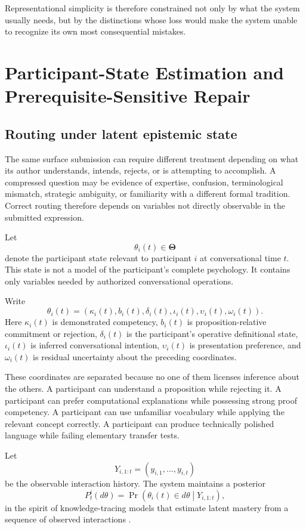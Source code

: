 \documentclass[11pt]{article}
\theoremstyle{definition}
\DeclareMathOperator{\Prob}{Pr}
\newcommand{\ThetaSpace}{\boldsymbol{\Theta}}
\begin{document}
Representational simplicity is therefore constrained not only by what the system usually needs, but by the distinctions whose loss would make the system unable to recognize its own most consequential mistakes.

\section{Participant-State Estimation and Prerequisite-Sensitive Repair}

\subsection{Routing under latent epistemic state}

The same surface submission can require different treatment depending on what its author understands, intends, rejects, or is attempting to accomplish. A compressed question may be evidence of expertise, confusion, terminological mismatch, strategic ambiguity, or familiarity with a different formal tradition. Correct routing therefore depends on variables not directly observable in the submitted expression.

Let
\[
\theta_i(t)\in\ThetaSpace
\]
denote the participant state relevant to participant \(i\) at conversational time \(t\). This state is not a model of the participant's complete psychology. It contains only variables needed by authorized conversational operations.

Write
\[
\theta_i(t)
=
\left(
\kappa_i(t),
b_i(t),
\delta_i(t),
\iota_i(t),
\upsilon_i(t),
\omega_i(t)
\right).
\]
Here \(\kappa_i(t)\) is demonstrated competency, \(b_i(t)\) is proposition-relative commitment or rejection, \(\delta_i(t)\) is the participant's operative definitional state, \(\iota_i(t)\) is inferred conversational intention, \(\upsilon_i(t)\) is presentation preference, and \(\omega_i(t)\) is residual uncertainty about the preceding coordinates.

These coordinates are separated because no one of them licenses inference about the others. A participant can understand a proposition while rejecting it. A participant can prefer computational explanations while possessing strong proof competency. A participant can use unfamiliar vocabulary while applying the relevant concept correctly. A participant can produce technically polished language while failing elementary transfer tests.

Let
\[
Y_{i,1:t}
=
(y_{i,1},\ldots,y_{i,t})
\]
be the observable interaction history. The system maintains a posterior
\[
P_t^i(d\theta)
=
\Prob
\left(
\theta_i(t)\in d\theta
\middle|
Y_{i,1:t}
\right),
\]
in the spirit of knowledge-tracing models that estimate latent mastery from a sequence of observed interactions \cite{corbett1994}.
\end{document}
